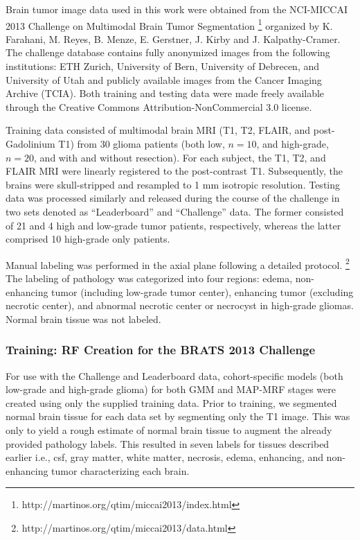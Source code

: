 \documentclass[preprint,authoryear,review,12pt]{elsarticle}
\begin{document}
Brain tumor image data used in this work were obtained from the NCI-MICCAI 2013 
Challenge on Multimodal Brain Tumor Segmentation%
\footnote{
http://martinos.org/qtim/miccai2013/index.html
}
organized by K. Farahani, M. Reyes, B. Menze, E. Gerstner, J. Kirby and J. Kalpathy-Cramer. 
The challenge database contains fully anonymized images from the following institutions: 
ETH Zurich, University of Bern, University of Debrecen, and University of Utah and 
publicly available images from the Cancer Imaging Archive (TCIA).  Both training 
and testing data were made freely available through the Creative Commons Attribution-NonCommercial 3.0 license.

Training data consisted of multimodal brain MRI (T1, T2, FLAIR, and 
post-Gadolinium T1) from 30 glioma patients (both low, $n=10$, and high-grade, $n=20$,
and with and without resection).  For each subject, the T1, T2, and 
FLAIR MRI were linearly registered to the post-contrast T1.  Subsequently,
the brains were skull-stripped and resampled to 1 mm isotropic resolution.
Testing data was processed similarly and released during the course of the
challenge in two sets denoted as ``Leaderboard'' and ``Challenge'' data.  
The former consisted of 21 and 4 high and low-grade tumor patients, respectively,
whereas the latter comprised 10 high-grade only patients.

Manual labeling was performed in the axial plane following a detailed
protocol.%
\footnote{
http://martinos.org/qtim/miccai2013/data.html
}
The labeling of pathology was categorized into four regions:
edema, non-enhancing tumor (including low-grade tumor center), 
enhancing tumor (excluding necrotic center), and abnormal
necrotic center or necrocyst in high-grade gliomas.
Normal brain tissue was not labeled. 

\subsubsection{Training: RF Creation for the BRATS 2013 Challenge}

For use with the Challenge and Leaderboard data, cohort-specific models (both 
low-grade and 
high-grade glioma) for both GMM and MAP-MRF stages were created using only the 
supplied training data.  Prior to training, we segmented normal brain tissue \citep{avants2011}
for each data set by segmenting only the T1 image.  This was only to yield
a rough estimate of normal brain tissue to augment the already provided 
pathology labels.  This resulted in seven labels for tissues described
earlier i.e., csf, gray matter, white matter,
necrosis, edema, enhancing, and non-enhancing tumor characterizing each brain.
\end{document}
